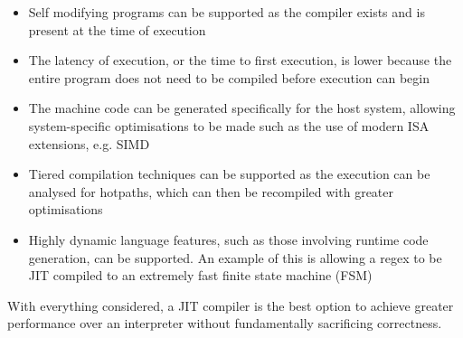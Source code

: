 \begin{itemize}
	\item Self modifying programs can be supported as the compiler exists and is present at the time of execution
	\item The latency of execution, or the time to first execution, is lower because the entire program does not need to be compiled before execution can begin
	\item The machine code can be generated specifically for the host system, allowing system-specific optimisations to be made such as the use of modern ISA extensions, e.g. SIMD
	\item Tiered compilation techniques can be supported as the execution can be analysed for hotpaths, which can then be recompiled with greater optimisations
	\item Highly dynamic language features, such as those involving runtime code generation, can be supported. An example of this is allowing a regex to be JIT compiled to an extremely fast finite state machine (FSM)
\end{itemize}

With everything considered, a JIT compiler is the best option to achieve greater performance over an interpreter without fundamentally sacrificing correctness.   
